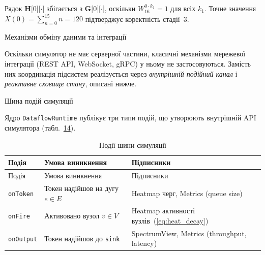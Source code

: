 Рядок \(\mathbf{H}\lbrack 0\rbrack\lbrack \cdot \rbrack\) збігається з
\(\mathbf{G}\lbrack 0\rbrack\lbrack \cdot \rbrack\), оскільки
\(W_{16}^{0 \cdot k_{1}} = 1\) для всіх \(k_{1}\). Точне значення
\(X(0) = \sum_{n = 0}^{15}n = 120\) підтверджує коректність стадії~3.

\protect{}\label{_Toc228121469}{}Механізми обміну даними та
інтеграції

Оскільки симулятор не має серверної частини, класичні механізми
мережевої інтеграції (REST API, WebSocket, gRPC) у ньому не
застосовуються. Замість них координація підсистем реалізується через
\emph{внутрішній подійний канал} і \emph{реактивне сховище стану},
описані нижче.

Шина подій симуляції

Ядро \texttt{DataflowRuntime} публікує три типи подій, що утворюють
внутрішній API симулятора (табл.~\hyperref[tab:events]{14}).

\begin{longtable}[]{@{}
  >{\raggedright\arraybackslash}p{}
  >{\raggedright\arraybackslash}p{}
  >{\raggedright\arraybackslash}p{}@{}}
\caption{\protect{}\label{tab:events}{}Події шини
симуляції}\tabularnewline
\toprule\noalign{}
\begin{minipage}[b]{\linewidth}\raggedright
Подія
\end{minipage} & \begin{minipage}[b]{\linewidth}\raggedright
Умова виникнення
\end{minipage} & \begin{minipage}[b]{\linewidth}\raggedright
Підписники
\end{minipage} \\
\midrule\noalign{}
\endfirsthead
\toprule\noalign{}
\begin{minipage}[b]{\linewidth}\raggedright
Подія
\end{minipage} & \begin{minipage}[b]{\linewidth}\raggedright
Умова виникнення
\end{minipage} & \begin{minipage}[b]{\linewidth}\raggedright
Підписники
\end{minipage} \\
\midrule\noalign{}
\endhead
\bottomrule\noalign{}
\endlastfoot
\texttt{onToken} & Токен надійшов на дугу \(e \in E\) & Heatmap черг,
Metrics (queue size) \\
\texttt{onFire} & Активовано вузол \(v \in V\) & Heatmap активності
вузлів~(\hyperref[eq:heat_decay]{{[}eq:heat\_decay{]}}) \\
\texttt{onOutput} & Токен надійшов до \texttt{sink} & SpectrumView,
Metrics (throughput, latency) \\
\end{longtable}

